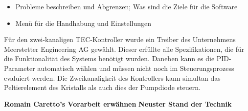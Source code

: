 \begin{itemize}
    \item Probleme beschreiben und Abgrenzen; Was sind die Ziele für die Software
    \item Menü für die Handhabung und Einstellungen
\end{itemize}

Für den zwei-kanaligen TEC-Kontroller wurde ein Treiber des Unternehmens Meerstetter Engineering AG gewählt. Dieser erfüllte alle Spezifikationen, die für die Funktionalität des Systems benötigt wurden. Daneben kann es die PID-Parameter automatisch wählen und müssen nicht noch im Steuerungsprozess evaluiert werden. Die Zweikanaligkeit des Kontrollers kann simultan das Peltierelement des Kristalls als auch dies der Pumpdiode steuern.

\textbf{Romain Caretto's Vorarbeit erwähnen}
\textbf{Neuster Stand der Technik}

\nocite{*}

% 
% 


